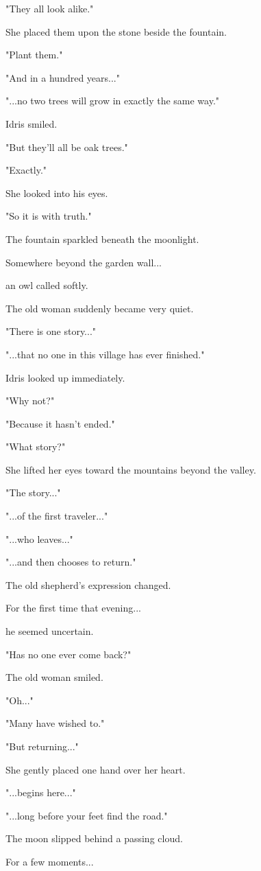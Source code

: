 \documentclass[12pt,openany]{book}
\begin{document}
"They all look alike."

She placed them upon the stone beside the fountain.

"Plant them."

"And in a hundred years..."

"...no two trees will grow in exactly the same way."

Idris smiled.

"But they'll all be oak trees."

"Exactly."

She looked into his eyes.

"So it is with truth."

The fountain sparkled beneath the moonlight.

Somewhere beyond the garden wall...

an owl called softly.

The old woman suddenly became very quiet.

"There is one story..."

"...that no one in this village has ever finished."

Idris looked up immediately.

"Why not?"

"Because it hasn't ended."

"What story?"

She lifted her eyes toward the mountains beyond the valley.

"The story..."

"...of the first traveler..."

"...who leaves..."

"...and then chooses to return."

The old shepherd's expression changed.

For the first time that evening...

he seemed uncertain.

"Has no one ever come back?"

The old woman smiled.

"Oh..."

"Many have wished to."

"But returning..."

She gently placed one hand over her heart.

"...begins here..."

"...long before your feet find the road."

The moon slipped behind a passing cloud.

For a few moments...
\end{document}

